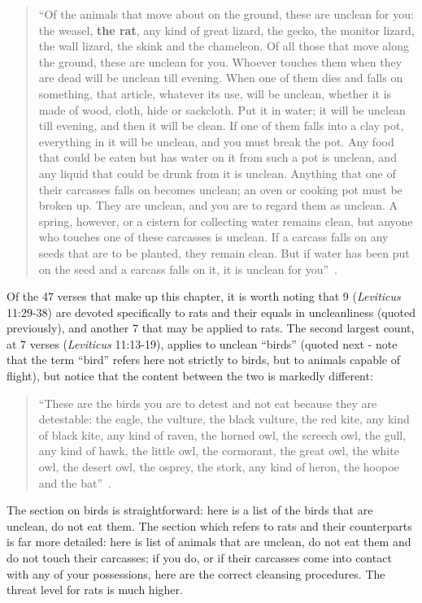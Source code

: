 \documentclass[12pt]{article}
\begin{document}
\begin{quote}
``Of the animals that move about on the ground, these are unclean for you: the weasel, \textbf{the rat}, any kind of great lizard, the gecko, the monitor lizard, the wall lizard, the skink and the chameleon. Of all those that move along the ground, these are unclean for you. Whoever touches them when they are dead will be unclean till evening. When one of them dies and falls on something, that article, whatever its use, will be unclean, whether it is made of wood, cloth, hide or sackcloth. Put it in water; it will be unclean till evening, and then it will be clean. If one of them falls into a clay pot, everything in it will be unclean, and you must break the pot. Any food that could be eaten but has water on it from such a pot is unclean, and any liquid that could be drunk from it is unclean. Anything that one of their carcasses falls on becomes unclean; an oven or cooking pot must be broken up. They are unclean, and you are to regard them as unclean. A spring, however, or a cistern for collecting water remains clean, but anyone who touches one of these carcasses is unclean. If a carcass falls on any seeds that are to be planted, they remain clean. But if water has been put on the seed and a carcass falls on it, it is unclean for you''~\cite{Leviticus1984}.
\end{quote}

Of the 47 verses that make up this chapter, it is worth noting that 9 (\textit{Leviticus} 11:29-38) are devoted specifically to rats and their equals in uncleanliness (quoted previously), and another 7 that may be applied to rats. The second largest count, at 7 verses (\textit{Leviticus} 11:13-19), applies to unclean ``birds'' (quoted next - note that the term ``bird'' refers here not strictly to birds, but to animals capable of flight), but notice that the content between the two is markedly different:

\begin{quote}
``These are the birds you are to detest and not eat because they are detestable: the eagle, the vulture, the black vulture, the red kite, any kind of black kite, any kind of raven, the horned owl, the screech owl, the gull, any kind of hawk, the little owl, the cormorant, the great owl, the white owl, the desert owl, the osprey, the stork, any kind of heron, the hoopoe and the bat''~\cite{Leviticus1984}.
\end{quote}

The section on birds is straightforward: here is a list of the birds that are unclean, do not eat them. The section which refers to rats and their counterparts is far more detailed: here is list of animals that are unclean, do not eat them and do not touch their carcasses; if you do, or if their carcasses come into contact with any of your possessions, here are the correct cleansing procedures. The threat level for rats is much higher.
\end{document}
